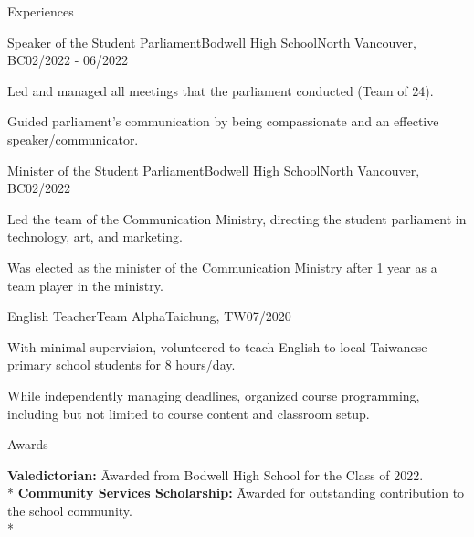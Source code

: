 \documentclass{article}
\newlength{\tabin}
\newlength{\secsep}
\newcommand{\lineunder}{\vspace*{-8pt} \\ \hspace*{-6pt} \hrulefill \\ \vspace*{-15pt}}
\newenvironment{tabbedsection}[1]{
  \begin{list}{}{
      \setlength{\itemsep}{0pt}
      \setlength{\labelsep}{0pt}
      \setlength{\labelwidth}{0pt}
      \setlength{\leftmargin}{\tabin}
      \setlength{\rightmargin}{\tabin}
      \setlength{\listparindent}{0pt}
      \setlength{\parsep}{0pt}
      \setlength{\parskip}{0pt}
      \setlength{\partopsep}{0pt}
      \setlength{\topsep}{#1}
    }
  \item[]
}{\end{list}}
\newenvironment{nospacetabbing}{
    \begin{tabbing}
}{\end{tabbing}\vspace{-1.2em}}
\newenvironment{resume_section}[1]{
  \filbreak
  \vspace{2\secsep}
  \textsc{\large#1}
  \lineunder
  \begin{tabbedsection}{\secsep}
}{\end{tabbedsection}}
\newenvironment{subitems}{
  \renewcommand{\labelitemi}{-}
  \begin{itemize}
      \setlength{\labelsep}{1em}
}{\end{itemize}}
\newenvironment{resume_employer}[4]{
  \vspace{\secsep}
  \textbf{#1} {\footnotesize #3} \hfill {\footnotesize#4} \hspace{-1em} \\
  \small{#2}  
  \vspace{\secsep}
  \begin{tabbedsection}{0pt}
  \begin{subitems}
}{\end{subitems}\end{tabbedsection}}
\begin{document}
\begin{resume_section}{Experiences}
  \begin{resume_employer}{Speaker of the Student Parliament}{Bodwell High School}{North Vancouver, BC}{02/2022 - 06/2022}
    \item Led and managed all meetings that the parliament conducted (Team of 24).
    \item Guided parliament's communication by being compassionate and an effective speaker/communicator.
  \end{resume_employer}

  \begin{resume_employer}{Minister of the Student Parliament}{Bodwell High School}{North Vancouver, BC}{02/2022}
    \item Led the team of the Communication Ministry, directing the student parliament in technology, art, and marketing.
    \item Was elected as the minister of the Communication Ministry after 1 year as a team player in the ministry.
  \end{resume_employer}

  \begin{resume_employer}{English Teacher}{Team Alpha}{Taichung, TW}{07/2020}
    \item With minimal supervision, volunteered to teach English to local Taiwanese primary school students for 8 hours/day.
    \item While independently managing deadlines, organized course programming, including but not limited to course content and classroom setup.
  \end{resume_employer}

\end{resume_section}
  
\begin{resume_section}{Awards}
  \begin{nospacetabbing}
    \textbf{Valedictorian:} \= Awarded from Bodwell High School for the Class of 2022.\\*
    \textbf{Community Services Scholarship:} \= Awarded for outstanding contribution to the school community.\\*
  \end{nospacetabbing}
\end{resume_section}
\end{document}
